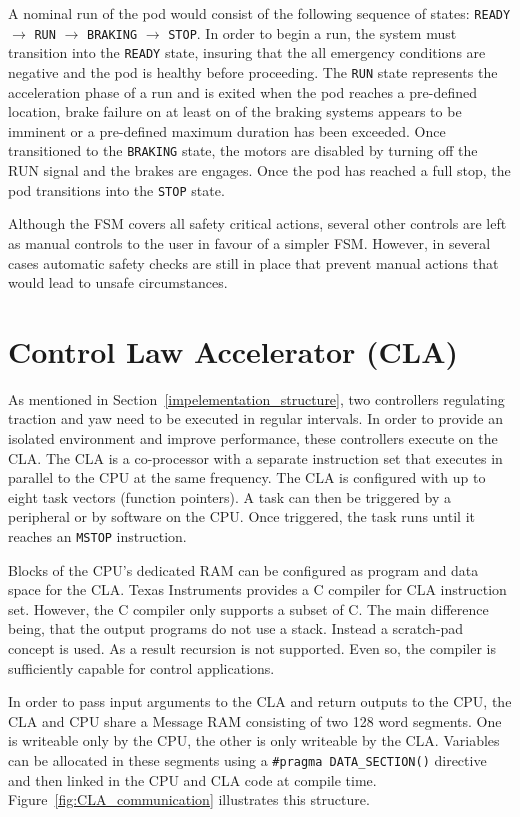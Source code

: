 A nominal run of the pod would consist of the following sequence of states: \texttt{READY} $\rightarrow$ \texttt{RUN} $\rightarrow$ \texttt{BRAKING} $\rightarrow$ \texttt{STOP}. In order to begin a run, the system must transition into the \texttt{READY} state, insuring that the all emergency conditions are negative and the pod is healthy before proceeding. The \texttt{RUN} state represents the acceleration phase of a run and is exited when the pod reaches a pre-defined location, brake failure on at least on of the braking systems appears to be imminent or a pre-defined maximum duration has been exceeded. Once transitioned to the \texttt{BRAKING} state, the motors are disabled by turning off the RUN signal and the brakes are engages. Once the pod has reached a full stop, the pod transitions into the \texttt{STOP} state.

Although the FSM covers all safety critical actions, several other controls are left as manual controls to the user in favour of a simpler FSM. However, in several cases automatic safety checks are still in place that prevent manual actions that would lead to unsafe circumstances.

\section{Control Law Accelerator (CLA)}

As mentioned in Section~\ref{impelementation_structure}, two controllers regulating traction and yaw need to be executed in regular intervals. In order to provide an isolated environment and improve performance, these controllers execute on the CLA. The CLA is a co-processor with a separate instruction set that executes in parallel to the CPU at the same frequency. The CLA is configured with up to eight task vectors (function pointers). A task can then be triggered by a peripheral or by software on the CPU. Once triggered, the task runs until it reaches an \texttt{MSTOP} instruction.

Blocks of the CPU's dedicated RAM can be configured as program and data space for the CLA. Texas Instruments provides a C compiler for CLA instruction set. However, the C compiler only supports a subset of C. The main difference being, that the output programs do not use a stack. Instead a scratch-pad concept is used. As a result recursion is not supported. Even so, the compiler is sufficiently capable for control applications.

In order to pass input arguments to the CLA and return outputs to the CPU, the CLA and CPU share a Message RAM consisting of two 128 word segments. One is writeable only by the CPU, the other is only writeable by the CLA. Variables can be allocated in these segments using a \texttt{#pragma DATA_SECTION()} directive and then linked in the CPU and CLA code at compile time. Figure~\ref{fig:CLA_communication} illustrates this structure.

